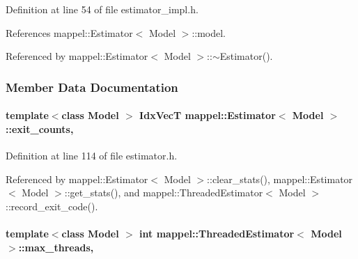 Definition at line 54 of file estimator\+\_\+impl.\+h.



References mappel\+::\+Estimator$<$ Model $>$\+::model.



Referenced by mappel\+::\+Estimator$<$ Model $>$\+::$\sim$\+Estimator().



\subsubsection{Member Data Documentation}
\paragraph[{\texorpdfstring{exit\+\_\+counts}{exit_counts}}]{\setlength{\rightskip}{0pt plus 5cm}template$<$class Model $>$ {\bf Idx\+VecT} {\bf mappel\+::\+Estimator}$<$ Model $>$\+::exit\+\_\+counts\hspace{0.3cm}{\ttfamily [protected]}, {\ttfamily [inherited]}}\hypertarget{classmappel_1_1Estimator_a490b648fdbd7ddae7ce41fbf26e29b48}{}\label{classmappel_1_1Estimator_a490b648fdbd7ddae7ce41fbf26e29b48}


Definition at line 114 of file estimator.\+h.



Referenced by mappel\+::\+Estimator$<$ Model $>$\+::clear\+\_\+stats(), mappel\+::\+Estimator$<$ Model $>$\+::get\+\_\+stats(), and mappel\+::\+Threaded\+Estimator$<$ Model $>$\+::record\+\_\+exit\+\_\+code().

\paragraph[{\texorpdfstring{max\+\_\+threads}{max_threads}}]{\setlength{\rightskip}{0pt plus 5cm}template$<$class Model $>$ int {\bf mappel\+::\+Threaded\+Estimator}$<$ Model $>$\+::max\+\_\+threads\hspace{0.3cm}{\ttfamily [protected]}, {\ttfamily [inherited]}}\hypertarget{classmappel_1_1ThreadedEstimator_a31391f8aaab3484f58bfdedbdb22be42}{}\label{classmappel_1_1ThreadedEstimator_a31391f8aaab3484f58bfdedbdb22be42}


